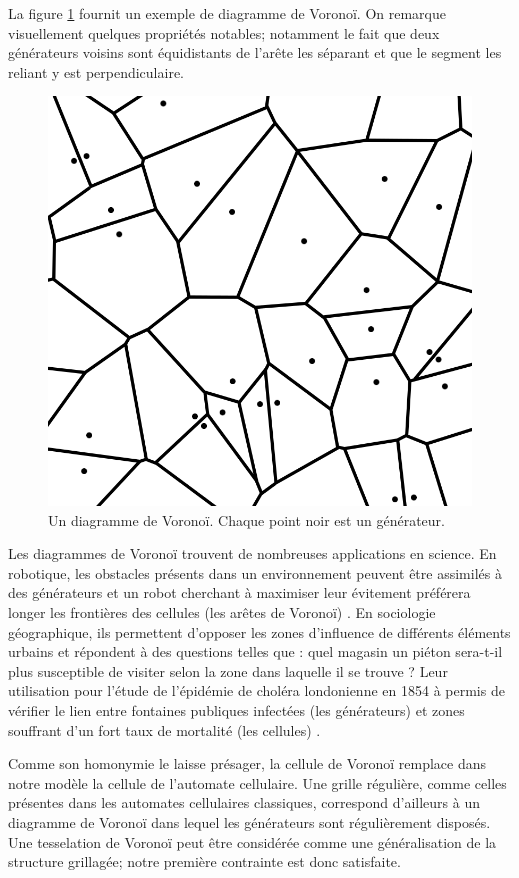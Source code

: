 \documentclass[12pt]{article}
\begin{document}
La figure \ref{fig:voronoi} fournit un exemple de diagramme de
Voronoï. On remarque visuellement quelques propriétés notables;
notamment le fait que deux générateurs voisins sont équidistants de
l'arête les séparant et que le segment les reliant y est
perpendiculaire.

\begin{figure}[!ht]
  \centering
  \includegraphics[width=0.7\linewidth]{images/voronoi.png}
  \caption{Un diagramme de Voronoï. Chaque point noir est un générateur.}
  \label{fig:voronoi}
\end{figure}

Les diagrammes de Voronoï trouvent de nombreuses applications en
science. En robotique, les obstacles présents dans un environnement
peuvent être assimilés à des générateurs et un robot cherchant à
maximiser leur évitement préférera longer les frontières des cellules
(les arêtes de Voronoï) \cite{Garrido2006}. En sociologie
géographique, ils permettent d'opposer les zones d'influence de
différents éléments urbains et répondent à des questions telles que :
quel magasin un piéton sera-t-il plus susceptible de visiter selon la
zone dans laquelle il se trouve ? Leur utilisation pour l'étude de
l'épidémie de choléra londonienne en 1854 à permis de vérifier le lien
entre fontaines publiques infectées (les générateurs) et zones
souffrant d'un fort taux de mortalité (les cellules)
\cite{Thomas2010}.

Comme son homonymie le laisse présager, la cellule de Voronoï remplace
dans notre modèle la cellule de l'automate cellulaire. Une grille
régulière, comme celles présentes dans les automates cellulaires
classiques, correspond d'ailleurs à un diagramme de Voronoï dans
lequel les générateurs sont régulièrement disposés. Une tesselation de
Voronoï peut être considérée comme une généralisation de la structure
grillagée; notre première contrainte est donc satisfaite.
\end{document}
